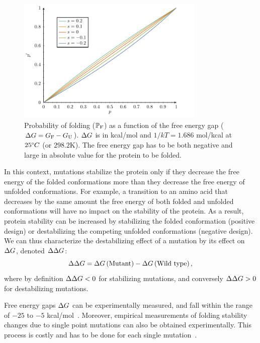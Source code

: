 \begin{figure}[H]
    \centering
    \includegraphics[width=0.8\textwidth, page=5] {figures.pdf}
    \caption[Probability of folding]{
    Probability of folding ($\mathbb{P}_{\text{F}}$) as a function of the free energy gap ($\Delta G = G_{\text{F}} - G_{\text{U}}$).
    $\Delta G$ is in kcal/mol and $1/kT=1.686$ mol/kcal at $25 \degree C$ (or $298.2$K).
    The free energy gap has to be both negative and large in absolute value for the protein to be folded.
    }
    \label{fig:intro-proba-folding}
\end{figure}

In this context, mutations stabilize the protein only if they decrease the free energy of the folded conformations more than they decrease the free energy of unfolded conformations.
For example, a transition to an amino acid that decreases by the same amount the free energy of both folded and unfolded conformations will have no impact on the stability of the protein.
As a result, protein stability can be increased by stabilizing the folded conformation (positive design) or destabilizing the competing unfolded conformations (negative design).
We can thus characterize the destabilizing effect of a mutation by its effect on $\Delta G$, denoted $\Delta \Delta G$:
\begin{equation}
    \Delta \Delta G = \Delta G \left( \text{Mutant} \right) - \Delta G  \left( \text{Wild type} \right),
\end{equation}
where by definition $\Delta \Delta G <0 $ for stabilizing mutations, and conversely $\Delta \Delta G > 0 $ for destabilizing mutations.

Free energy gaps $\Delta G$ can be experimentally measured, and fall within the range of $-25$ to $-5$ kcal/mol~\citep{Kumar2006, Gromiha2016}.
Moreover, empirical measurements of folding stability changes due to single point mutations can also be obtained experimentally. This process is costly and has to be done for each single mutation~\citep{Rocklin2017}.

